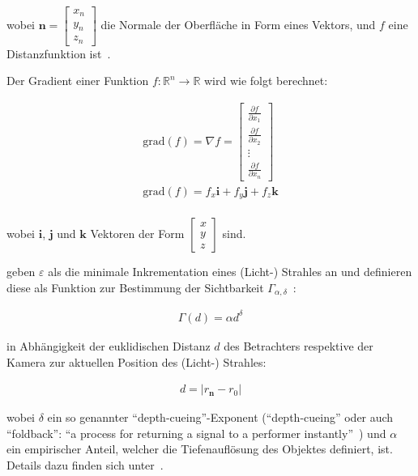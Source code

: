 wobei $\bm{n} = \begin{bmatrix} x_{n} \\ y_{n} \\ z_{n} \end{bmatrix}$
die Normale der Oberfläche in Form eines Vektors, und $f$ eine
Distanzfunktion ist~\parencites[S. 292 bis 293]{hart_ray_1989}[S.
13]{hart_ray_1993}.

Der Gradient einer Funktion $f: \mathbb{R}^{n} \to \mathbb{R}$ wird wie
folgt berechnet:

\begin{gather}
    \text{grad}(f) = \nabla f = \begin{bmatrix}
        \frac{\partial f}{\partial x_{1}} \\
        \frac{\partial f}{\partial x_{2}} \\
        \vdots \\
        \frac{\partial f}{\partial x_{n}} 
    \end{bmatrix}\\
    \text{grad}(f) = f_{x}\bm{i} + f_{y}\bm{j} + f_{z}\bm{k}\\
\end{gather}

wobei $\bm{i}$, $\bm{j}$ und $\bm{k}$ Vektoren der Form $\begin{bmatrix}
    x \\ y \\ z \end{bmatrix}$ sind.

\citeauthor{hart_ray_1989} geben $\varepsilon$ als die minimale
Inkrementation eines (Licht-) Strahles an und definieren diese als
Funktion zur Bestimmung der Sichtbarkeit $\Gamma_{\alpha,
    \delta}$~\parencite[S. 293]{hart_ray_1989}:

\begin{gather}
    \Gamma(d) = \alpha d^{\delta}
\end{gather}

in Abhängigkeit der euklidischen Distanz $d$ des Betrachters respektive
der Kamera zur aktuellen Position des (Licht-) Strahles:

\begin{gather}
    d = |r_{\bm{n}} - r_{0}|
\end{gather}

wobei $\delta$ ein so genannter ``depth-cueing''-Exponent
(``depth-cueing'' oder auch ``foldback'': ``a process for returning a
signal to a performer
instantly''~\parencite{liam_collins_sons_&_co._ltd._collins_2015}) und
$\alpha$ ein empirischer Anteil, welcher die Tiefenauflösung des
Objektes definiert, ist.  Details dazu finden sich
unter~\cite[S. 293, Abschnitt 4.2 --- ``Clarity'']{hart_ray_1989}.

